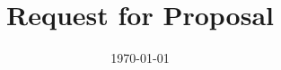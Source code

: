 \documentclass[oneside, 12pt]{memoir}
\title{Request for Proposal}
\date{\today}
\begin{document}
\begin{titlingpage}
	
\end{titlingpage}

\newpage


\newpage
\tableofcontents*


\newpage


%
%


%
\end{document}
